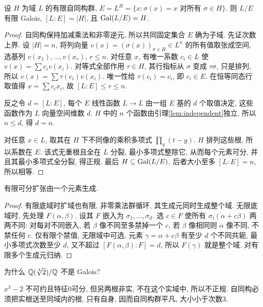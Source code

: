 \begin{theorem}[Artin]\label{thm:artin}
设 $H$ 为域 $L$ 的有限自同构群, $E=L^H=\{x:\sigma(x)=x\text{ 对所有 }\sigma\in H\}$. 则 $L/E$ 有限 Galois, $[L:E]=|H|$, 且 $\operatorname{Gal}(L/E)=H$.
\end{theorem}
\begin{proof}
自同构保持加减乘法和非零逆元, 所以共同固定集合 $E$ 确为子域. 先证次数上界. 设 $|H|=n$, 将列向量 $v(x)=(\sigma(x))_{\sigma\in H}\in L^n$ 的所有值取张成空间, 选基列 $v(x_1),\ldots,v(x_r)$, $r\le n$. 对任意 $x$, 有唯一系数 $c_i\in L$ 使 $v(x)=\sum c_iv(x_i)$. 对等式全部作用 $\tau\in H$, 其行指标从 $\sigma$ 变成 $\tau\sigma$, 只是排列, 所以 $v(x)=\sum\tau(c_i)v(x_i)$. 唯一性给 $\tau(c_i)=c_i$, 即 $c_i\in E$. 在恒等同态行取值得 $x=\sum c_ix_i$, 故 $[L:E]\le r\le n$.

反之令 $d=[L:E]$, 每个 $E$ 线性函数 $L\to L$ 由一组 $E$ 基的 $d$ 个取值决定, 这些函数作为 $L$ 向量空间维数 $d$. $H$ 中的 $n$ 个函数由引理\ref{lem:independent}独立, 所以 $n\le d$, 得 $d=n$.

对任意 $x\in L$, 取其在 $H$ 下不同像的乘积多项式 $\prod_y(t-y)$. $H$ 排列这些根, 所以系数在 $E$. 该式无重根且全在 $L$ 分裂, 最小多项式整除它, 从而每个元素可分, 并且其最小多项式全分裂, 得正规. 最后 $H\subseteq\operatorname{Gal}(L/E)$, 后者大小至多 $[L:E]=n$, 所以相等.
\end{proof}
\begin{theorem}
有限可分扩张由一个元素生成.
\end{theorem}
\begin{proof}
有限底域时扩域也有限, 非零乘法群循环, 其生成元同时生成整个域. 无限底域时, 先处理 $F(\alpha,\beta)$. 设其 $F$ 嵌入为 $\sigma_1,\ldots,\sigma_d$. 选 $c\in F$ 使所有 $\sigma_i(\alpha+c\beta)$ 两两不同: 对每对不同嵌入, 若 $\beta$ 像不同至多禁掉一个 $c$, 若 $\beta$ 像相同则 $\alpha$ 像不同, 不禁任何 $c$. 仅有限个禁值, 无限域中可选. 元素 $\gamma=\alpha+c\beta$ 有至少 $d$ 个不同共轭, 最小多项式次数至少 $d$, 又不超过 $[F(\alpha,\beta):F]=d$, 所以 $F(\gamma)$ 就是整个域. 对有限多个生成元归纳.
\end{proof}
\begin{exercise}为什么 $\mathbb Q(\sqrt[3]2)/\mathbb Q$ 不是 Galois?\end{exercise}
\begin{solution}
$x^3-2$ 不可约且特征0可分, 但另两根非实, 不在这个实域中, 所以不正规. 自同构必须把实根送至同域内的根, 只有自身, 因而自同构群平凡, 大小小于次数3.
\end{solution}
